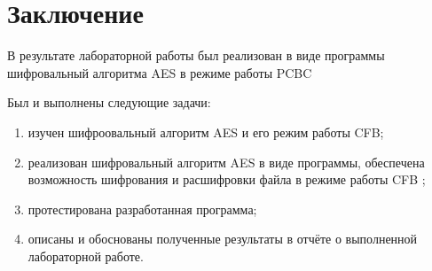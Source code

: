 \chapter*{Заключение}

В результате лабораторной работы был реализован в виде программы шифровальный алгоритма AES в режиме работы PCBC 

Был и выполнены следующие задачи:
\begin{enumerate}[label=\arabic*)]
	\item изучен шифроовальный алгоритм AES и его режим работы CFB;
	\item реализован шифровальный алгоритм AES в виде программы, обеспечена возможность шифрования и расшифровки файла в режиме работы CFB	;
	\item протестирована разработанная программа;
	\item описаны и обоснованы полученные результаты в отчёте о выполненной лабораторной работе.
\end{enumerate}